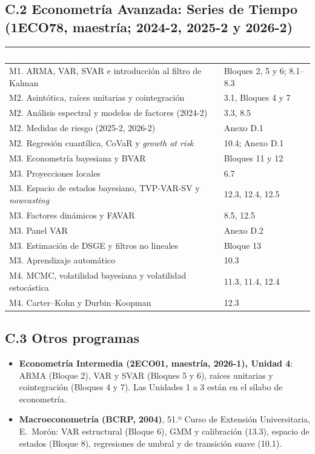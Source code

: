 \documentclass[11pt,a4paper]{article}
\newcommand{\cab}[1]{\textcolor{white}{\sffamily\bfseries #1}}
\newcommand{\filasalternas}{\rowcolors{2}{white}{tonoPalido}}
\begin{document}
\subsection*{C.2 Econometría Avanzada: Series de Tiempo (1ECO78, maestría; 2024-2, 2025-2 y 2026-2)}
{\small\filasalternas
\noindent\begin{tabularx}{\textwidth}{>{\raggedright\arraybackslash}p{6.2cm}X}
\toprule
\rowcolor{tonoOscuro}\cab{Módulo o sesión} & \cab{Temas del plan} \\
\midrule
M1. ARMA, VAR, SVAR e introducción al filtro de Kalman & Bloques 2, 5 y 6; 8.1--8.3 \\
M2. Asintótica, raíces unitarias y cointegración & 3.1, Bloques 4 y 7 \\
M2. Análisis espectral y modelos de factores (2024-2) & 3.3, 8.5 \\
M2. Medidas de riesgo (2025-2, 2026-2) & Anexo D.1 \\
M2. Regresión cuantílica, CoVaR y \emph{growth at risk} & 10.4; Anexo D.1 \\
M3. Econometría bayesiana y BVAR & Bloques 11 y 12 \\
M3. Proyecciones locales & 6.7 \\
M3. Espacio de estados bayesiano, TVP-VAR-SV y \emph{nowcasting} & 12.3, 12.4, 12.5 \\
M3. Factores dinámicos y FAVAR & 8.5, 12.5 \\
M3. Panel VAR & Anexo D.2 \\
M3. Estimación de DSGE y filtros no lineales & Bloque 13 \\
M3. Aprendizaje automático & 10.3 \\
M4. MCMC, volatilidad bayesiana y volatilidad estocástica & 11.3, 11.4, 12.4 \\
M4. Carter--Kohn y Durbin--Koopman & 12.3 \\
\bottomrule
\end{tabularx}
}

\subsection*{C.3 Otros programas}
\begin{itemize}[leftmargin=1.4em,itemsep=1pt]
  \item \textbf{Econometría Intermedia (2ECO01, maestría, 2026-1), Unidad 4}:
        ARMA (Bloque 2), VAR y SVAR (Bloques 5 y 6), raíces unitarias y
        cointegración (Bloques 4 y 7). Las Unidades 1 a 3 están en el sílabo
        de econometría.
  \item \textbf{Macroeconometría (BCRP, 2004)}, 51.º Curso de Extensión
        Universitaria, E.~Morón: VAR estructural (Bloque 6), GMM y calibración
        (13.3), espacio de estados (Bloque 8), regresiones de umbral y de
        transición suave (10.1).
\end{itemize}
\end{document}
